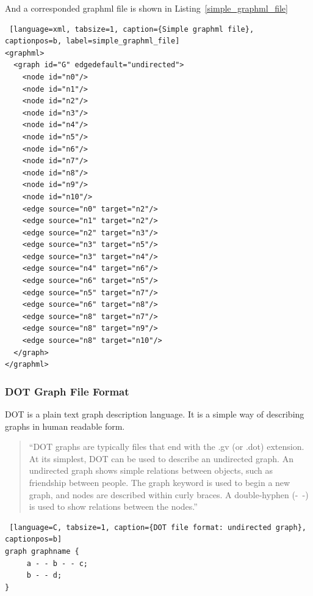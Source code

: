 And a corresponded graphml file is shown in Listing~\ref{simple_graphml_file}

\begin{center}
\renewcommand{\thelstlisting}{\thesection.\arabic{lstlisting}}
\begin{lstlisting} [language=xml, tabsize=1, caption={Simple graphml file}, captionpos=b, label=simple_graphml_file]
<graphml>
  <graph id="G" edgedefault="undirected">
    <node id="n0"/>
    <node id="n1"/>
    <node id="n2"/>
    <node id="n3"/>
    <node id="n4"/>
    <node id="n5"/>
    <node id="n6"/>
    <node id="n7"/>
    <node id="n8"/>
    <node id="n9"/>
    <node id="n10"/>
    <edge source="n0" target="n2"/>
    <edge source="n1" target="n2"/>
    <edge source="n2" target="n3"/>
    <edge source="n3" target="n5"/>
    <edge source="n3" target="n4"/>
    <edge source="n4" target="n6"/>
    <edge source="n6" target="n5"/>
    <edge source="n5" target="n7"/>
    <edge source="n6" target="n8"/>
    <edge source="n8" target="n7"/>
    <edge source="n8" target="n9"/>
    <edge source="n8" target="n10"/>
  </graph>
</graphml>
\end{lstlisting}
\end{center}

\subsubsection{DOT Graph File Format}
DOT is a plain text graph description language. It is a simple way of describing graphs in human readable form.

\begin{quotation}
``DOT graphs are typically files that end with the .gv (or .dot) extension.
At its simplest, DOT can be used to describe an undirected graph.
An undirected graph shows simple relations between objects, such as friendship between people.
The graph keyword is used to begin a new graph, and nodes are described within curly braces.
A double-hyphen (-\ -) is used to show relations between the nodes.''~\cite{DOT}
\end{quotation}

\begin{center}
\renewcommand{\thelstlisting}{\thesection.\arabic{lstlisting}}
\begin{lstlisting} [language=C, tabsize=1, caption={DOT file format: undirected graph}, captionpos=b]
graph graphname {
     a - - b - - c;
     b - - d;
}
\end{lstlisting}
\end{center}

